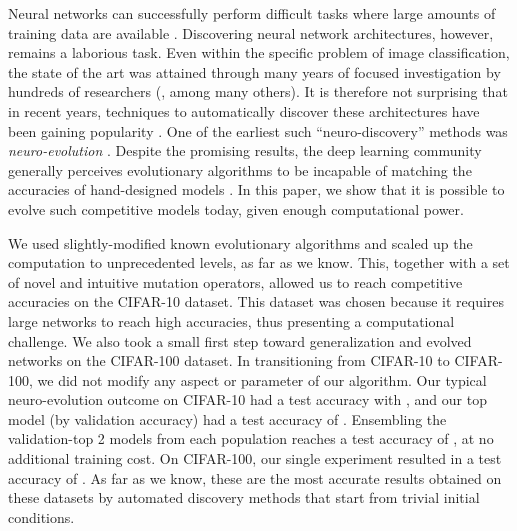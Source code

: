 \documentclass{article}
\renewcommand{\cite}[1]{\citep{#1}}
\newcommand{\citing}[1]{#1}
\newcommand{\meanacc}{94.1}
\newcommand{\stddevacc}{0.4}
\newcommand{\meanflopsbase}{9}
\newcommand{\meanflopsexp}{19}
\newcommand{\bestacc}{94.6}
\newcommand{\totalflopsbase}{4}
\newcommand{\totalflopsexp}{20}
\newcommand{\onehundredacc}{77.0}
\newcommand{\onehundredflopsbase}{2}
\newcommand{\onehundredflopsexp}{20}
\newcommand{\ensembleacc}{95.6}
\begin{document}
Neural networks can successfully perform difficult tasks where large amounts of training data are available \cite{he2015delving, weyand2016planet, silver2016mastering,wu2016google}. Discovering neural network architectures, however, remains a laborious task. Even within the specific problem of image classification, the state of the art was attained through many years of focused investigation by hundreds of researchers \citing{(\citet{krizhevsky2012imagenet, simonyan2014very, szegedy2015going, he2016deep, huang2016densely}, among many others)}. It is therefore not surprising that in recent years, techniques to automatically discover these architectures have been gaining popularity \cite{bergstra2012random, snoek2012practical, han2015learning, baker2016designing, zoph2016neural}. One of the earliest such ``neuro-discovery'' methods was {\em neuro-evolution} \cite{miller1989designing, stanley2002evolving, stanley2007compositional, bayer2009evolving, stanley2009hypercube, breuel2010automlp, pugh2013evolving, kim2015deep, zaremba2015empirical, fernando2016convolution, morse2016simple}. Despite the promising results, the deep learning community generally perceives evolutionary algorithms to be incapable of matching the accuracies of hand-designed models \cite{verbancsics2013generative, baker2016designing, zoph2016neural}. In this paper, we show that it is possible to evolve such competitive models today, given enough computational power.

We used slightly-modified known evolutionary algorithms and scaled up the computation to unprecedented levels, as far as we know. This, together with a set of novel and intuitive mutation operators, allowed us to reach competitive accuracies on the CIFAR-10 dataset. This dataset was chosen because it requires large networks to reach high accuracies, thus presenting a computational challenge. We also took a small first step toward generalization and evolved networks on the CIFAR-100 dataset. In transitioning from CIFAR-10 to CIFAR-100, we did not modify any aspect or parameter of our algorithm. Our typical neuro-evolution outcome on CIFAR-10 had a test accuracy with  \aggregateresult{\meanacc}{\stddevacc}{\meanflopsbase}{\meanflopsexp}, and our top model (by validation accuracy) had a test accuracy of \singleresult{\bestacc}{\totalflopsbase}{\totalflopsexp}. Ensembling the validation-top 2 models from each population reaches a test accuracy of \plainresult{\ensembleacc}, at no additional training cost. On CIFAR-100, our single experiment resulted in a test accuracy of \singleresult{\onehundredacc}{\onehundredflopsbase}{\onehundredflopsexp}. As far as we know, these are the most accurate results obtained on these datasets by automated discovery methods that start from trivial initial conditions.
\end{document}
